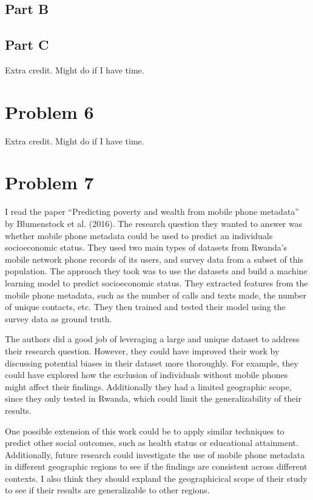 \documentclass[12pt]{article}
\begin{document}
\subsection*{Part B}
\subsection*{Part C}

Extra credit. Might do if I have time.

\section*{Problem 6}

Extra credit. Might do if I have time. 

\section*{Problem 7}

I read the paper ``Predicting poverty and wealth from mobile phone metadata'' by Blumenstock et al. (2016).  The research question they wanted to answer was whether mobile phone metadata could be used to predict an individuals socioeconomic status. They used two main types of datasets from Rwanda's mobile network phone records of its users, and survey data from a subset of this population. The approach they took was to use the datasets and build a machine learning model to predict socioeconomic status. They extracted features from the mobile phone metadata, such as the number of calls and texts made, the number of unique contacts, etc. They then trained and tested their model using the survey data as ground truth.

The authors did a good job of leveraging a large and unique dataset to address their research question.  However, they could have improved their work by discussing potential biases in their dataset more thoroughly. For example, they could have explored how the exclusion of individuals without mobile phones might affect their findings. Additionally they had a limited geographic scope, since they only tested in Rwanda, which could limit the generalizability of their results.

One possible extension of this work could be to apply similar techniques to predict other social outcomes, such as health status or educational attainment. Additionally, future research could investigate the use of mobile phone metadata in different geographic regions to see if the findings are consistent across different contexts. I also think they should expland the geographicical scope of their study to see if their results are generalizable to other regions.
\end{document}
